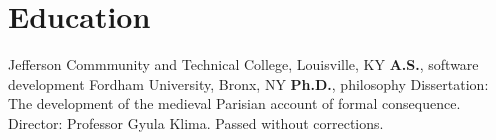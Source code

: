 \vspace*{0.4cm}
\section{Education}
{%
	Jefferson Commmunity and Technical College, Louisville, KY}
{%
	\textbf{A.S.}, software development}
{}
	{%
		Fordham University, Bronx, NY}
	{%
		\textbf{Ph.D.}, philosophy}
	{%
	Dissertation: The development of the medieval Parisian account of formal consequence. Director: Professor Gyula Klima. Passed without corrections.}

